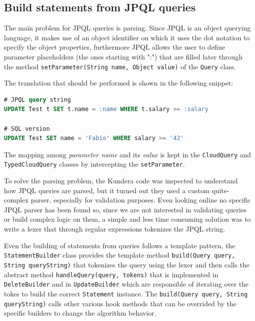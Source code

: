 \subsection{Build statements from JPQL queries}
The main problem for JPQL queries is parsing. Since JPQL is an object querying language, it makes use of an object identifier on which it uses the dot notation to specify the object properties, furthermore JPQL allows the user to define parameter placeholders (the ones starting with ":") that are filled later through the method \texttt{setParameter(String name, Object value)} of the \texttt{Query} class.

\noindent The translation that should be performed is shown in the following snippet:

\begin{lstlisting}[language=SQL, caption=JPQL to SQL translation, label=code:query-translation, numbers=none]
# JPQL query string
UPDATE Test t SET t.name = :name WHERE t.salary >= :salary

# SQL version
UPDATE Test SET name = 'Fabio' WHERE salary >= '42'
\end{lstlisting} 

\noindent The mapping among \textit{parameter name} and its \textit{value} is kept in the \texttt{CloudQuery} and \texttt{TypedCloudQuery} classes by intercepting the \texttt{setParameter}.

\newparagraph To solve the parsing problem, the Kundera code was inspected to understand how JPQL queries are parsed, but it turned out they used a custom quite-complex parser, especially for validation purposes. Even looking online no specific JPQL parser has been found so, since we are not interested in validating queries or build complex logic on them, a simple and less time consuming solution was to write a lexer that through regular expressions tokenizes the JPQL string.

\noindent Even the building of statements from queries follows a template pattern, the \texttt{StatementBuilder} class provides the template method \texttt{build(Query query, String queryString)} that tokenizes the query using the lexer and then calls the abstract method \texttt{handleQuery(query, tokens)} that is implemented in \texttt{DeleteBuilder} and in \texttt{UpdateBuilder} which are responsible of iterating over the tokes to build the correct \texttt{Statement} instance.
The \texttt{build(Query query, String queryString)} calls other various hook methods that can be overrided by the specific builders to change the algorithm behavior.


